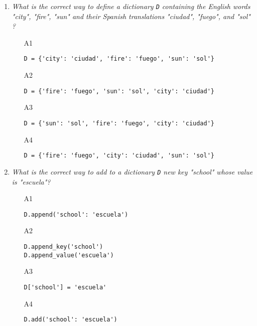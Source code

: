 \begin{enumerate}
\vspace{6mm}

\item {\em What is the correct way to define a dictionary {\tt D} containing the 
      English words "city", "fire", "sun" and their Spanish translations "ciudad",
      "fuego", and "sol" ?}\\

\begin{enumerate}
\item[A1] 
\begin{verbatim}
D = {'city': 'ciudad', 'fire': 'fuego', 'sun': 'sol'}
\end{verbatim}
\item[A2] 
\begin{verbatim}
D = {'fire': 'fuego', 'sun': 'sol', 'city': 'ciudad'}
\end{verbatim}
\item[A3] 
\begin{verbatim}
D = {'sun': 'sol', 'fire': 'fuego', 'city': 'ciudad'}
\end{verbatim}
\item[A4] 
\begin{verbatim}
D = {'fire': 'fuego', 'city': 'ciudad', 'sun': 'sol'}
\end{verbatim}
\end{enumerate}

\vspace{6mm}

\item {\em What is the correct way to add to a dictionary {\tt D} new key 
"school" whose value is "escuela"?}\\

\begin{enumerate}
\item[A1] 
\begin{verbatim}
D.append('school': 'escuela')
\end{verbatim}
\item[A2] 
\begin{verbatim}
D.append_key('school')
D.append_value('escuela')
\end{verbatim}
\item[A3] 
\begin{verbatim}
D['school'] = 'escuela'
\end{verbatim}
\item[A4] 
\begin{verbatim}
D.add('school': 'escuela')
\end{verbatim}
\end{enumerate}


\end{enumerate}

